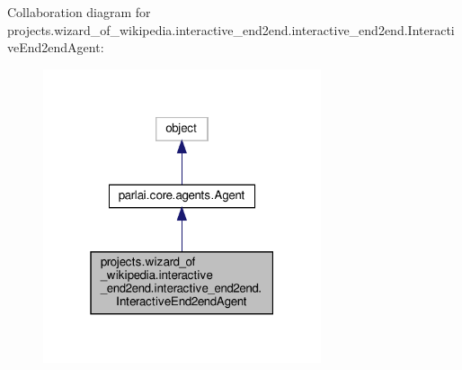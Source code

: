 Collaboration diagram for projects.\+wizard\+\_\+of\+\_\+wikipedia.\+interactive\+\_\+end2end.\+interactive\+\_\+end2end.\+Interactive\+End2end\+Agent\+:
\nopagebreak
\begin{figure}[H]
\begin{center}
\leavevmode
\includegraphics[width=232pt]{d1/db6/classprojects_1_1wizard__of__wikipedia_1_1interactive__end2end_1_1interactive__end2end_1_1InteractiveEnd2endAgent__coll__graph}
\end{center}
\end{figure}
